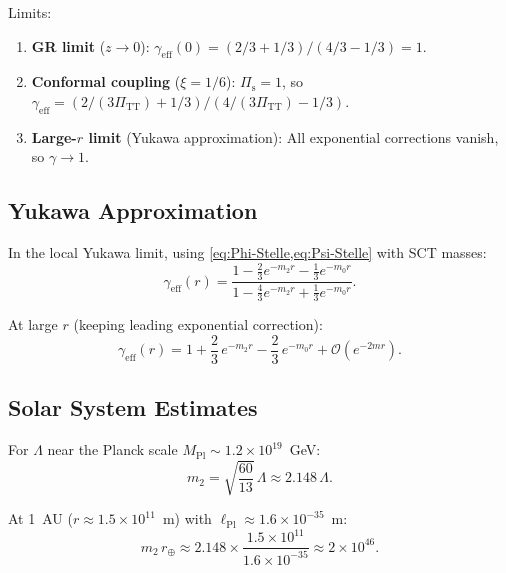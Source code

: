 \documentclass[11pt,a4paper]{article}
\theoremstyle{plain}
\theoremstyle{definition}
\theoremstyle{remark}
\begin{document}
\noindent Limits:
\begin{enumerate}[nosep]
  \item \textbf{GR limit} ($z \to 0$):
    $\gamma_{\mathrm{eff}}(0) = (2/3+1/3)/(4/3-1/3) = 1$.
  \item \textbf{Conformal coupling} ($\xi = 1/6$):
    $\Pi_{\mathrm{s}} = 1$, so
    $\gamma_{\mathrm{eff}} = (2/(3\Pi_{\mathrm{TT}}) + 1/3)
    / (4/(3\Pi_{\mathrm{TT}}) - 1/3)$.
  \item \textbf{Large-$r$ limit} (Yukawa approximation):
    All exponential corrections vanish, so $\gamma \to 1$.
\end{enumerate}

\subsection{Yukawa Approximation}

In the local Yukawa limit, using \cref{eq:Phi-Stelle,eq:Psi-Stelle}
with SCT masses:
\begin{equation}\label{eq:gamma-yukawa}
  \gamma_{\mathrm{eff}}(r)
  = \frac{1 - \frac{2}{3}e^{-m_2 r} - \frac{1}{3}e^{-m_0 r}}
         {1 - \frac{4}{3}e^{-m_2 r} + \frac{1}{3}e^{-m_0 r}}.
\end{equation}

At large $r$ (keeping leading exponential correction):
\begin{equation}\label{eq:gamma-expansion}
  \gamma_{\mathrm{eff}}(r) = 1
  + \frac{2}{3}\, e^{-m_2 r}
  - \frac{2}{3}\, e^{-m_0 r}
  + \mathcal{O}(e^{-2m r}).
\end{equation}

\subsection{Solar System Estimates}

For $\Lambda$ near the Planck scale $M_{\mathrm{Pl}}
\sim 1.2 \times 10^{19}$~GeV:
\begin{equation}
  m_2 = \sqrt{\frac{60}{13}}\,\Lambda
  \approx 2.148\,\Lambda.
\end{equation}

At 1~AU ($r \approx 1.5\times 10^{11}$~m) with $\ell_{\mathrm{Pl}}
\approx 1.6\times 10^{-35}$~m:
\begin{equation}\label{eq:m2r-AU}
  m_2\, r_{\oplus} \approx 2.148 \times \frac{1.5\times 10^{11}}
  {1.6\times 10^{-35}} \approx 2 \times 10^{46}.
\end{equation}
\end{document}
